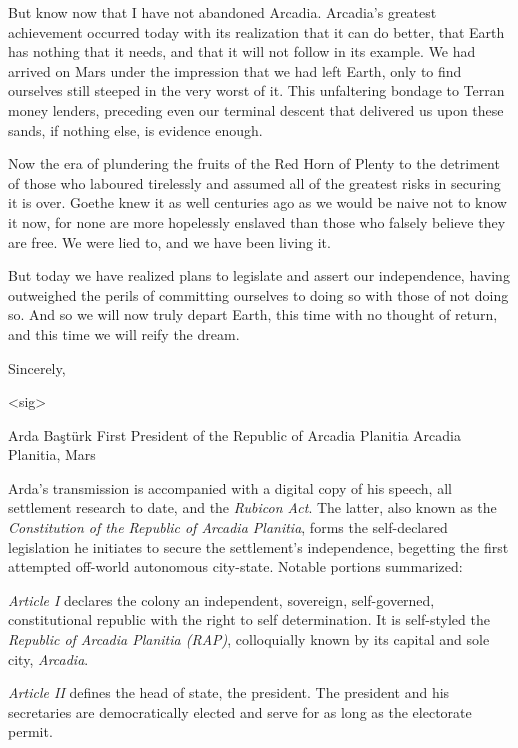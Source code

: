 But know now that I have not abandoned Arcadia. Arcadia's greatest achievement occurred today with its realization that it can do better, that Earth has nothing that it needs, and that it will not follow in its example. We had arrived on Mars under the impression that we had left Earth, only to find ourselves still steeped in the very worst of it. This unfaltering bondage to Terran money lenders, preceding even our terminal descent that delivered us upon these sands, if nothing else, is evidence enough.

Now the era of plundering the fruits of the Red Horn of Plenty to the detriment of those who laboured tirelessly and assumed all of the greatest risks in securing it is over. Goethe knew it as well centuries ago as we would be naive not to know it now, for none are more hopelessly enslaved than those who falsely believe they are free. We were lied to, and we have been living it. 

But today we have realized plans to legislate and assert our independence, having outweighed the perils of committing ourselves to doing so with those of not doing so. And so we will now truly depart Earth, this time with no thought of return, and this time we will reify the dream.

Sincerely,

<sig>

Arda Baştürk
First President of the Republic of Arcadia Planitia
Arcadia Planitia, Mars
\stopTimelineDocument

Arda's transmission is accompanied with a digital copy of his speech, all settlement research to date, and the {\it Rubicon Act}. The latter, also known as the {\it Constitution of the Republic of Arcadia Planitia}, forms the self-declared legislation he initiates to secure the settlement's independence, begetting the first attempted off-world autonomous city-state. Notable portions summarized:

\startTimelineDocument
\startitemize[5]
\setupwhitespace[big]
\item {\it Article I} declares the colony an independent, sovereign, self-governed, constitutional republic with the right to self determination. It is self-styled the {\it Republic of Arcadia Planitia (RAP)}, colloquially known by its capital and sole city, {\it Arcadia}.

\item {\it Article II} defines the head of state, the president. The president and his secretaries are democratically elected and serve for as long as the electorate permit.

